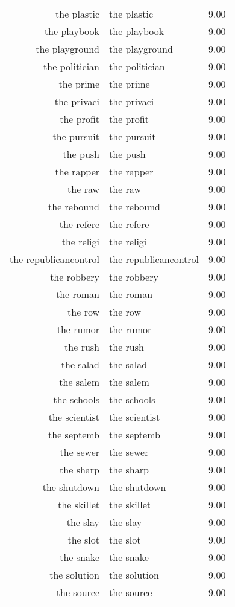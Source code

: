 \begin{table}[ht]
\begin{tabular}{rlr}
  the plastic & the plastic & 9.00 \\ 
  the playbook & the playbook & 9.00 \\ 
  the playground & the playground & 9.00 \\ 
  the politician & the politician & 9.00 \\ 
  the prime & the prime & 9.00 \\ 
  the privaci & the privaci & 9.00 \\ 
  the profit & the profit & 9.00 \\ 
  the pursuit & the pursuit & 9.00 \\ 
  the push & the push & 9.00 \\ 
  the rapper & the rapper & 9.00 \\ 
  the raw & the raw & 9.00 \\ 
  the rebound & the rebound & 9.00 \\ 
  the refere & the refere & 9.00 \\ 
  the religi & the religi & 9.00 \\ 
  the republicancontrol & the republicancontrol & 9.00 \\ 
  the robbery & the robbery & 9.00 \\ 
  the roman & the roman & 9.00 \\ 
  the row & the row & 9.00 \\ 
  the rumor & the rumor & 9.00 \\ 
  the rush & the rush & 9.00 \\ 
  the salad & the salad & 9.00 \\ 
  the salem & the salem & 9.00 \\ 
  the schools & the schools & 9.00 \\ 
  the scientist & the scientist & 9.00 \\ 
  the septemb & the septemb & 9.00 \\ 
  the sewer & the sewer & 9.00 \\ 
  the sharp & the sharp & 9.00 \\ 
  the shutdown & the shutdown & 9.00 \\ 
  the skillet & the skillet & 9.00 \\ 
  the slay & the slay & 9.00 \\ 
  the slot & the slot & 9.00 \\ 
  the snake & the snake & 9.00 \\ 
  the solution & the solution & 9.00 \\ 
  the source & the source & 9.00 \\ 

\end{tabular}
\end{table}
